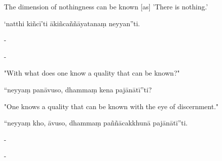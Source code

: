 \begin{samepage}
\begin{leftcolumn*}
The dimension of nothingness can be known [as] 'There is nothing.'
\end{leftcolumn*}

\begin{rightcolumn}
‘natthi kiñcī’ti ākiñcaññāyatanaṃ neyyan”ti.
\end{rightcolumn}
\end{samepage}

\begin{samepage}
\begin{leftcolumn*}
-
\end{leftcolumn*}

\begin{rightcolumn}
-
\end{rightcolumn}
\end{samepage}

\begin{samepage}
\begin{leftcolumn*}
"With what does one know a quality that can be known?"
\end{leftcolumn*}

\begin{rightcolumn}
“neyyaṃ panāvuso, dhammaṃ kena pajānātī”ti?
\end{rightcolumn}
\end{samepage}

\begin{samepage}
\begin{leftcolumn*}
"One knows a quality that can be known with the eye of discernment."
\end{leftcolumn*}

\begin{rightcolumn}
“neyyaṃ kho, āvuso, dhammaṃ paññācakkhunā pajānātī”ti.
\end{rightcolumn}
\end{samepage}

\begin{samepage}
\begin{leftcolumn*}
-
\end{leftcolumn*}

\begin{rightcolumn}
-
\end{rightcolumn}
\end{samepage}

